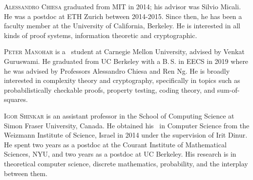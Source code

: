 \documentclass{toc}
\theoremstyle{plain}
\begin{document}
%
%
%
%
%
%
%
%
%
%
%
%
%
%
\begin{tocaboutauthors}
\begin{tocabout}[chiesa]  %
  \textsc{Alessandro Chiesa}
  graduated from MIT in 2014; his advisor was Silvio Micali.
  He was a postdoc at ETH Zurich between 2014-2015. Since then, he has been a
  faculty member at the University of California, Berkeley. He is interested
  in all kinds of proof systems, information theoretic and cryptographic.
\end{tocabout}
\begin{tocabout}[manohar]  %
  \textsc{Peter Manohar}
  is a \phd\ student at Carnegie Mellon University, advised by
  Venkat Guruswami. He graduated from UC Berkeley with a B.\,S. in EECS in
  2019 where he was advised by Professors Alessandro Chiesa and Ren Ng.
  He is broadly interested in complexity theory and cryptography, specifically
  in topics such as probabilistically checkable proofs, property testing,
  coding theory, and sum-of-squares.
\end{tocabout}
\begin{tocabout}[shinkar]
  \textsc{Igor Shinkar} is an assistant professor in the School of
Computing Science %
at   %
Simon Fraser University, Canada. He obtained his \phd\ in
Computer Science from
the   %
Weizmann Institute of Science, Israel in 2014 under the supervision
of %
%
Irit Dinur. He spent two years as a postdoc
%
at    %
the Courant Institute of Mathematical Sciences, NYU, and two years as
a postdoc at UC Berkeley. His research is in theoretical computer science,
discrete mathematics, probability, and the interplay between them.
\end{tocabout}
\end{tocaboutauthors}
\end{document}
